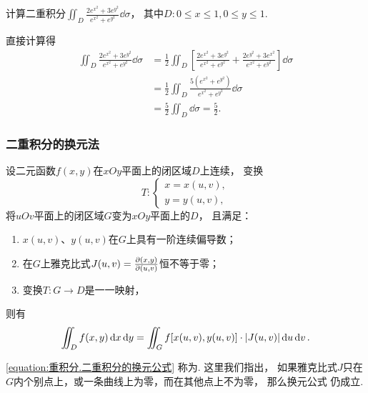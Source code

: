\begin{example}
计算二重积分\(\iint_D \frac{2 e^{x^2} + 3 e^{y^2}}{e^{x^2} + e^{y^2}} \dd\sigma\)，
其中\(D: 0 \leq x \leq 1, 0 \leq y \leq 1\).
\begin{solution}
直接计算得\begin{align*}
	\iint_D \frac{2 e^{x^2} + 3 e^{y^2}}{e^{x^2} + e^{y^2}} \dd\sigma
	&= \frac12 \iint_D \left[
		\frac{2 e^{x^2} + 3 e^{y^2}}{e^{x^2} + e^{y^2}}
		+ \frac{2 e^{y^2} + 3 e^{x^2}}{e^{x^2} + e^{y^2}}
	\right] \dd\sigma \\
	&= \frac12 \iint_D \frac{5 (e^{x^2} + e^{y^2})}{e^{x^2} + e^{y^2}} \dd\sigma \\
	&= \frac52 \iint_D \dd\sigma
	= \frac52.
\end{align*}
\end{solution}
\end{example}

\subsubsection{二重积分的换元法}
\begin{theorem}
设二元函数\(f(x,y)\)在\(xOy\)平面上的闭区域\(D\)上连续，
变换\[
	T\colon \left\{ \begin{array}{l}
		x = x(u,v), \\
		y = y(u,v),
	\end{array} \right.
\]将\(uOv\)平面上的闭区域\(G\)变为\(xOy\)平面上的\(D\)，
且满足：\begin{enumerate}
	\item \(x(u,v)\)、\(y(u,v)\)在\(G\)上具有一阶连续偏导数；
	\item 在\(G\)上雅克比式\(J(u,v) = \pdv{ (x,y) }{ (u,v) }\)恒不等于零；
	\item 变换\(T\colon G \to D\)是一一映射，
\end{enumerate}
则有\begin{equation}\label{equation:重积分.二重积分的换元公式}
	\iint_D f(x,y) \dd{x} \dd{y}
	= \iint_G f[x(u,v),y(u,v)] \cdot \abs{J(u,v)} \dd{u} \dd{v}.
\end{equation}
\end{theorem}
\cref{equation:重积分.二重积分的换元公式} 称为.
这里我们指出，
如果雅克比式\(J\)只在\(G\)内个别点上，或一条曲线上为零，而在其他点上不为零，
那么换元公式  仍成立.

